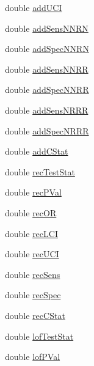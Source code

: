 \begin{DoxyCompactItemize}
double \hyperlink{structGenoStatsResults_a482aec4de6354215ca53d1729bca9093}{addUCI}
\item 
double \hyperlink{structGenoStatsResults_a6ac0807bd05fcf31d48d8192aa095883}{addSensNNRN}
\item 
double \hyperlink{structGenoStatsResults_a7d51f06d687ad181dc9a63fd5fc5b768}{addSpecNNRN}
\item 
double \hyperlink{structGenoStatsResults_a46272ba2d01869dd66808155ebc730d5}{addSensNNRR}
\item 
double \hyperlink{structGenoStatsResults_aa4b0e16cb145bd07a331ca05ae0ab9c4}{addSpecNNRR}
\item 
double \hyperlink{structGenoStatsResults_aa27687e4be8d33aef6258d195c702b53}{addSensNRRR}
\item 
double \hyperlink{structGenoStatsResults_a08e6aba4bebb09fadad7ca931f162d53}{addSpecNRRR}
\item 
double \hyperlink{structGenoStatsResults_ae8171c259ef70ff74c60d4b9bfaa8f66}{addCStat}
\item 
double \hyperlink{structGenoStatsResults_ac0f7db49afdf8540e776a8d38e8629a5}{recTestStat}
\item 
double \hyperlink{structGenoStatsResults_a21a0647a0cfdd5854b384a52a3f71a94}{recPVal}
\item 
double \hyperlink{structGenoStatsResults_a2430df2403f3c1b9a8e05310eaadce90}{recOR}
\item 
double \hyperlink{structGenoStatsResults_a64941b6a97b09760197bd1ce374a9ee5}{recLCI}
\item 
double \hyperlink{structGenoStatsResults_a2aa9578515d50fb8bcef93198c92d63e}{recUCI}
\item 
double \hyperlink{structGenoStatsResults_ac1756c908c9b3c5a303d32c04b250896}{recSens}
\item 
double \hyperlink{structGenoStatsResults_ada57487f856ab09b21ad51bdf339d70c}{recSpec}
\item 
double \hyperlink{structGenoStatsResults_a2014d24446d9eda0ea0ab4dfcdd33df4}{recCStat}
\item 
double \hyperlink{structGenoStatsResults_ac3089d116f118fa8bf7176a8d1a98b89}{lofTestStat}
\item 
double \hyperlink{structGenoStatsResults_ab48fc67c244ac998823af608cc87fc06}{lofPVal}
\end{DoxyCompactItemize}


